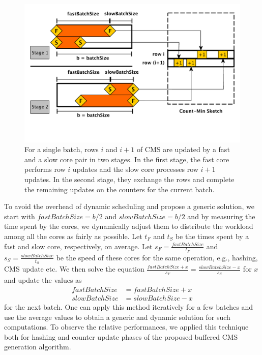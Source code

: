 \documentclass[runningheads]{llncs}
\begin{document}
\begin{figure}[htbp]
\begin{minipage}[c]{0.65\textwidth}
\includegraphics[width=\textwidth]{fastslow.pdf}
  \end{minipage}\hfill\hfill\hfill
 \begin{minipage}[c]{0.32\textwidth}
\caption{\small{For a single batch, rows $i$ and $i+1$ of CMS are updated by a fast and a slow core pair in two stages. In the first stage, the fast core performs row $i$ updates and the slow core processes row $i+1$ updates. In the second stage, they exchange the rows and complete the remaining updates on the counters for the current batch.}}
\label{fig:fastslow}
  \end{minipage}
  \vspace*{-4ex}
\end{figure}


To avoid the overhead of dynamic scheduling and propose a generic solution, we start with $fastBatchSize = b/2$ and $slowBatchSize = b/2$ and by measuring the time spent by the cores, we dynamically adjust them to distribute the workload among all the cores as fairly as possible. Let $t_F$ and $t_S$ be the times spent by a fast and slow core, respectively, on average. Let $s_F = \frac{fastBatchSize}{t_F}$ and $s_S = \frac{slowBatchSize}{t_S}$ be the speed of these cores for the same operation, e.g., hashing, CMS update etc. We then solve the equation $\frac{fastBatchSize + x}{s_F} = \frac{slowBatchSize - x}{s_S}$ for $x$ and update the values as 
\begin{align*}
fastBatchSize &= fastBatchSize + x\\
slowBatchSize &= slowBatchSize - x
\end{align*}
for the next batch. One can apply this method iteratively for a few batches and use the average values to obtain a generic and dynamic solution for such computations. To observe the relative performances, we applied this technique both for hashing and counter update phases of the proposed buffered CMS generation algorithm.
\end{document}
